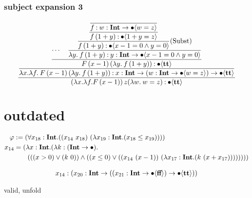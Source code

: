 \documentclass{article}
\begin{document}
\subsubsection{subject expansion 3}

\begin{equation*}
    \dfrac{
    \dfrac{
        \dfrac{
            \cdots
            \quad
            \dfrac{
                \dfrac{
                    \dfrac{
                        \dfrac{}{
                            f \mathbin{:} {w} : \textbf{Int} \to \bullet \langle w=z \rangle
                        }
                    }{
                        f\,(1+y) \mathbin{:} \bullet \langle 1+y=z \rangle
                    }
                } {
                    f\,(1+y) \mathbin{:} \bullet \langle x - 1 = 0 \wedge y = 0 \rangle
                }\text{(Subst)}
            } {
                \lambda y.\: f\,(1+y) \mathbin{:} {y} : \textbf{Int} \to \bullet \langle x - 1 = 0 \wedge y = 0 \rangle
            }
        }{
            F\, (x-1)\, (\lambda y.\: f\,(1+y))  \mathbin{:} \bullet \langle \textbf{tt} \rangle
        }
    }{
        \lambda x. \lambda f.\: F\, (x-1)\, (\lambda y.\: f\,(1+y)) \mathbin{:} {x} : \textbf{Int} \to ({w} : \textbf{Int} \to \bullet \langle w = z \rangle) \to \bullet \langle \textbf{tt} \rangle
    }}{
        (\lambda x. \lambda f. F\, (x-1))\, z (\lambda w.\: w = z) \mathbin{:} \bullet \langle \textbf{tt} \rangle
    }
\end{equation*}

\section{outdated}

\begin{align*}
    \varphi &:= (\forall x_{ 18 }: \textbf{Int} . ((x_{ 14 }\  x_{ 18 } )\ (\lambda x_{ 19 }: \textbf{Int} . ( x_{ 18 }  \leq  x_{ 19 } ))))\\
    x_{ 14 } &=
    (\lambda x: \textbf{Int} . (\lambda k: (\textbf{Int}  \to \bullet
    ). \\
    &\qquad ((( x  >  0 )\lor (k\  0 ))\land (( x  \leq  0 )\lor ((x_{ 14 }\ ( x   -   1 ))\ (\lambda x_{ 17 }: \textbf{Int} . (k\ ( x   +   x_{ 17 } )))))))) \\
\end{align*}


\begin{align*}
x_{ 14 } &: ({ x_{ 20 } } : \textbf{Int} \to (({ x_{ 21 } } : \textbf{Int} \to \bullet \langle  \textbf{ff}  \rangle)\to \bullet \langle  \textbf{tt}  \rangle))\\
\end{align*}

valid, unfold
\end{document}

